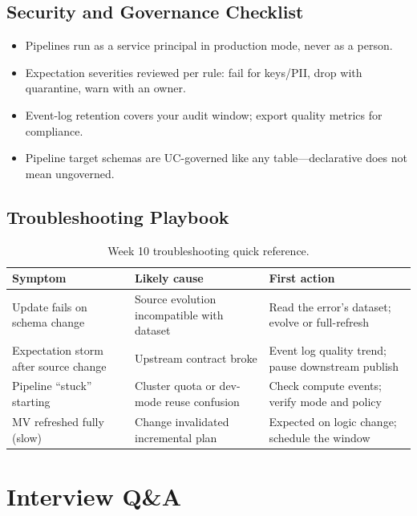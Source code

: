 \subsection{Security and Governance Checklist}
\begin{itemize}
    \item Pipelines run as a service principal in production mode, never as a person.
    \item Expectation severities reviewed per rule: fail for keys/PII, drop with quarantine, warn with an owner.
    \item Event-log retention covers your audit window; export quality metrics for compliance.
    \item Pipeline target schemas are UC-governed like any table---declarative does not mean ungoverned.
\end{itemize}

\subsection{Troubleshooting Playbook}
\begin{table}[H]
\centering
\small
\begin{tabular}{@{}p{3.6cm}p{4.2cm}p{4.8cm}@{}}
\toprule
\textbf{Symptom} & \textbf{Likely cause} & \textbf{First action} \\
\midrule
Update fails on schema change & Source evolution incompatible with dataset & Read the error's dataset; evolve or full-refresh \\
Expectation storm after source change & Upstream contract broke & Event log quality trend; pause downstream publish \\
Pipeline ``stuck'' starting & Cluster quota or dev-mode reuse confusion & Check compute events; verify mode and policy \\
MV refreshed fully (slow) & Change invalidated incremental plan & Expected on logic change; schedule the window \\
\bottomrule
\end{tabular}
\caption{Week 10 troubleshooting quick reference.}
\label{tab:ch10-trouble}
\end{table}

\section{Interview Q\&A}
